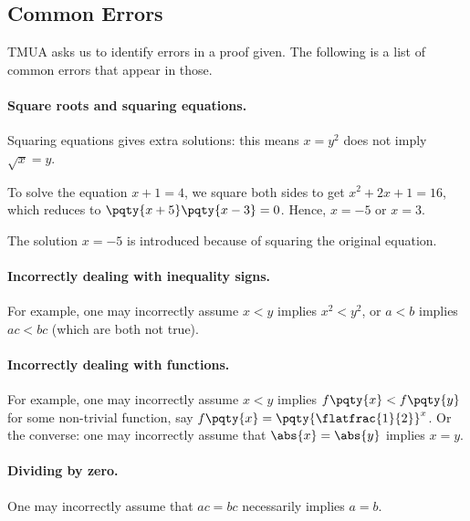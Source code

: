 \documentclass{article}
\begin{document}
\subsection{Common Errors}

TMUA asks us to identify errors in a proof given. The following is a list of common errors that appear in those.

\paragraph{Square roots and squaring equations.} Squaring equations gives extra solutions: this means \(x = y^2\) does not imply \(\sqrt{x} = y\).

\begin{example}
    To solve the equation \(x + 1 = 4\), we square both sides to get \(x^2 + 2x + 1 = 16\), which reduces to \(\pqty{x + 5} \pqty{x - 3} = 0\). Hence, \(x = -5\) or \(x = 3\).

    The solution \(x = -5\) is introduced because of squaring the original equation.
\end{example}

\paragraph{Incorrectly dealing with inequality signs.} For example, one may incorrectly assume \(x < y\) implies \(x^2 < y^2\), or \(a < b\) implies \(ac < bc\) (which are both not true).

\paragraph{Incorrectly dealing with functions.} For example, one may incorrectly assume \(x < y\) implies \(f\pqty{x} < f\pqty{y}\) for some non-trivial function, say \(f\pqty{x} = \pqty{\flatfrac{1}{2}}^x\). Or the converse: one may incorrectly assume that \(\abs{x} = \abs{y}\) implies \(x = y\).

\paragraph{Dividing by zero.} One may incorrectly assume that \(ac = bc\) necessarily implies \(a = b\).
\end{document}

